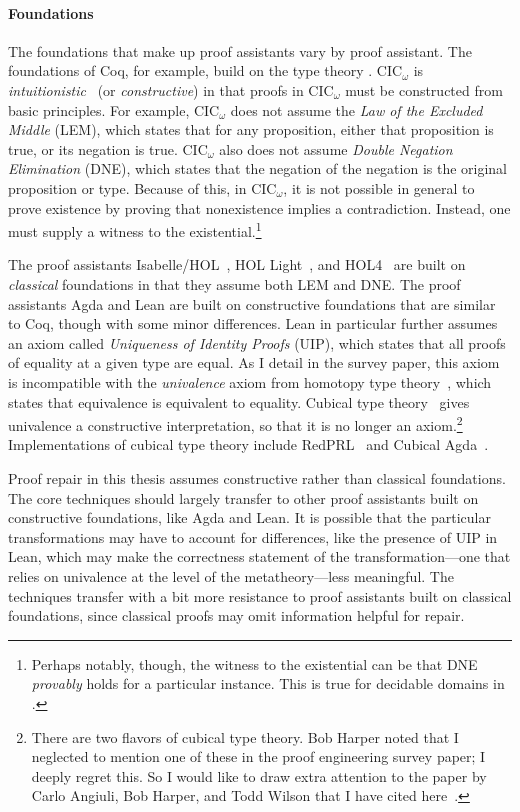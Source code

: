 \paragraph{Foundations}
The foundations that make up proof assistants vary by proof assistant.
The foundations of Coq, for example, build on the type theory .
CIC$_{\omega}$ is \textit{intuitionistic}~\cite{Heyting1956} (or \textit{constructive}) in that
proofs in CIC$_{\omega}$ must be constructed from basic principles.
For example, CIC$_{\omega}$ does not assume the \textit{Law of the Excluded Middle} (LEM),
which states that for any proposition, either that proposition is true, or its negation is true.
CIC$_{\omega}$ also does not assume \textit{Double Negation Elimination} (DNE),
which states that the negation of the negation is the original proposition or type.
Because of this, in CIC$_{\omega}$, it is not possible in general to prove existence by proving that 
nonexistence implies a contradiction.
Instead, one must supply a witness to the existential.\footnote{Perhaps notably, though, the witness to the existential can be that 
DNE \emph{provably} holds for a particular instance. This is true for decidable domains in .} 

The proof assistants Isabelle/HOL~\cite{isabelle}, HOL Light~\cite{hollight}, and HOL4~\cite{hol4-interact} are built on \textit{classical} foundations
in that they assume both LEM and DNE.
The proof assistants Agda and Lean are built on constructive foundations that are similar to Coq, though with some minor differences.
Lean in particular further assumes an axiom called \textit{Uniqueness of Identity Proofs} (UIP), which states that all proofs of
equality at a given type are equal.
As I detail in the survey paper, this axiom is incompatible with the \textit{univalence} axiom from homotopy type theory~\cite{univalent2013homotopy},
which states that equivalence is equivalent to equality.
Cubical type theory~\cite{cohen2016cubical, angiuli2017cubical} gives univalence a constructive interpretation,
so that it is no longer an axiom.\footnote{There are two flavors of cubical type theory.
Bob Harper noted that I neglected to mention one of these in the proof engineering survey paper; I deeply regret this.
So I would like to draw extra attention to the paper by Carlo Angiuli, Bob Harper, and Todd Wilson that I have cited here~\cite{angiuli2017cubical}.}
Implementations of cubical type theory include RedPRL~\cite{redprl} and Cubical Agda~\cite{cubical-agda}.

Proof repair in this thesis assumes constructive rather than classical foundations.
The core techniques should largely transfer to other proof assistants built on constructive foundations, like Agda and Lean.
It is possible that the particular transformations may have to account for differences, like the presence of UIP in Lean,
which may make the correctness statement of the \toolnamec transformation---one that relies on univalence at the level of the metatheory---less meaningful.
The techniques transfer with a bit more resistance to proof assistants built on classical foundations,
since classical proofs may omit information helpful for repair.

